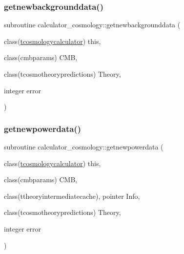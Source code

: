\mbox{\label{namespacecalculator__cosmology_a9b28cf77b06f92cdf1260e0a1f8a72c1}} 
\subsubsection{\texorpdfstring{getnewbackgrounddata()}{getnewbackgrounddata()}}
{\footnotesize\ttfamily subroutine calculator\+\_\+cosmology\+::getnewbackgrounddata (\begin{DoxyParamCaption}\item[{class(\mbox{\hyperlink{structcalculator__cosmology_1_1tcosmologycalculator}{tcosmologycalculator}})}]{this,  }\item[{class(cmbparams)}]{C\+MB,  }\item[{class(tcosmotheorypredictions)}]{Theory,  }\item[{integer}]{error }\end{DoxyParamCaption})\hspace{0.3cm}{\ttfamily [private]}}

\mbox{\label{namespacecalculator__cosmology_a456c87c218951defda2a9bcf4f23abb8}} 
\subsubsection{\texorpdfstring{getnewpowerdata()}{getnewpowerdata()}}
{\footnotesize\ttfamily subroutine calculator\+\_\+cosmology\+::getnewpowerdata (\begin{DoxyParamCaption}\item[{class(\mbox{\hyperlink{structcalculator__cosmology_1_1tcosmologycalculator}{tcosmologycalculator}})}]{this,  }\item[{class(cmbparams)}]{C\+MB,  }\item[{class(ttheoryintermediatecache), pointer}]{Info,  }\item[{class(tcosmotheorypredictions)}]{Theory,  }\item[{integer}]{error }\end{DoxyParamCaption})\hspace{0.3cm}{\ttfamily [private]}}


